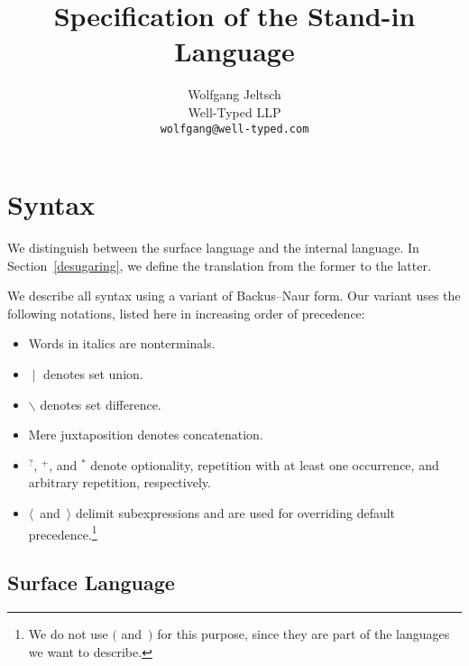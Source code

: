 \documentclass{scrartcl}
\title{Specification of the Stand-in Language}
\author{%
    Wolfgang Jeltsch\\
    \small Well-Typed LLP\\
    \small\texttt{wolfgang@well-typed.com}%
}
\newcommand{\optional}{^?}
\newcommand{\some}{^+}
\newcommand{\many}{^*}
\begin{document}
\maketitle

\section{Syntax}

We distinguish between the surface language and the internal language.
In Section~\ref{desugaring}, we define the translation from the former
to the latter.

We describe all syntax using a variant of Backus–Naur form. Our variant
uses the following notations, listed here in increasing order of
precedence:
\begin{itemize}

\item

Words in italics are nonterminals.

\item

$∣$ denotes set union.

\item

$∖$ denotes set difference.

\item

Mere juxtaposition denotes concatenation.

\item

$\optional$, $\some$, and $\many$ denote optionality, repetition with at
least one occurrence, and arbitrary repetition, respectively.

\item

$⟨$~and~$⟩$ delimit subexpressions and are used for overriding default
precedence.\footnote{We do not use $($ and~$)$ for this purpose, since
they are part of the languages we want to describe.}

\end{itemize}

\subsection{Surface Language}
\end{document}
